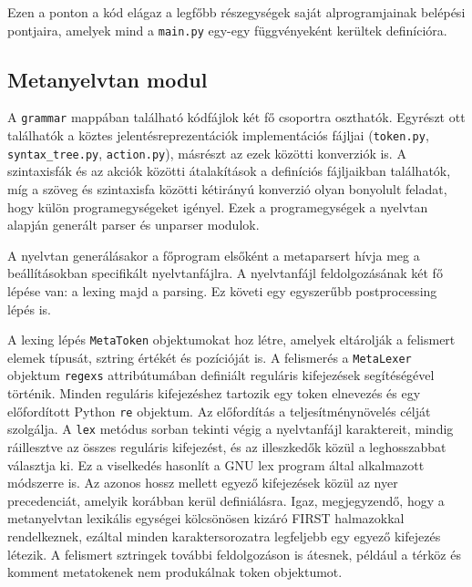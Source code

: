 \documentclass[twoside, 12pt]{report}
\begin{document}
Ezen a ponton a kód elágaz a legfőbb részegységek saját alprogramjainak belépési pontjaira, amelyek mind a \verb|main.py| egy-egy függvényeként kerültek definícióra.

\subsection{Metanyelvtan modul}

A \verb|grammar| mappában található kódfájlok két fő csoportra oszthatók. Egyrészt ott találhatók a köztes jelentésreprezentációk implementációs fájljai (\verb|token.py|, \verb|syntax_tree.py|, \verb|action.py|), másrészt az ezek közötti konverziók is. A szintaxisfák és az akciók közötti átalakítások a definíciós fájljaikban találhatók, míg a szöveg és szintaxisfa közötti kétirányú konverzió olyan bonyolult feladat, hogy külön programegységeket igényel. Ezek a programegységek a nyelvtan alapján generált parser és unparser modulok.

A nyelvtan generálásakor a főprogram elsőként a metaparsert hívja meg a beállításokban specifikált nyelvtanfájlra. A nyelvtanfájl feldolgozásának két fő lépése van: a lexing majd a parsing. Ez követi egy egyszerűbb postprocessing lépés is.

A lexing lépés \verb|MetaToken| objektumokat hoz létre, amelyek eltárolják a felismert elemek típusát, sztring értékét és pozícióját is. A felismerés a \verb|MetaLexer| objektum \verb|regexs| attribútumában definiált reguláris kifejezések segítéségével történik. Minden reguláris kifejezéshez tartozik egy token elnevezés és egy előfordított Python \verb|re| objektum. Az előfordítás a teljesítménynövelés célját szolgálja. A \verb|lex| metódus sorban tekinti végig a nyelvtanfájl karaktereit, mindig ráillesztve az összes reguláris kifejezést, és az illeszkedők közül a leghosszabbat választja ki. Ez a viselkedés hasonlít a GNU lex program által alkalmazott módszerre is. Az azonos hossz mellett egyező kifejezések közül az nyer precedenciát, amelyik korábban kerül definiálásra. Igaz, megjegyzendő, hogy a metanyelvtan lexikális egységei kölcsönösen kizáró FIRST halmazokkal rendelkeznek, ezáltal minden karaktersorozatra legfeljebb egy egyező kifejezés létezik. A felismert sztringek további feldolgozáson is átesnek, például a térköz és komment metatokenek nem produkálnak token objektumot.
\end{document}
